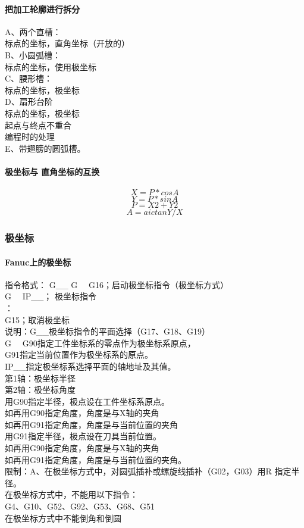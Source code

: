 \paragraph{把加工轮廓进行拆分}
\noindent A、两个直槽：\\
标点的坐标，直角坐标（开放的）\\
B、小圆弧槽：\\
标点的坐标，使用极坐标\\
C、腰形槽：\\
标点的坐标，极坐标\\
D、扇形台阶\\
标点的坐标，极坐标\\
起点与终点不重合\\
编程时的处理\\
E、带翅膀的圆弧槽。
\paragraph{极坐标与 直角坐标的互换}
$$X=P*cosA$$
$$Y=P*sinA$$
$$P=X2+Y2$$
$$A=aictanY/X$$
\subsubsection{极坐标}
\paragraph{Fanuc上的极坐标}
指令格式： G\_\_ G~~ G16；启动极坐标指令（极坐标方式）\\
G~~ IP\_\_； 极坐标指令\\
：\\
G15；取消极坐标\\
说明：G\_\_极坐标指令的平面选择（G17、G18、G19）\\
G~~ G90指定工件坐标系的零点作为极坐标系原点，\\
G91指定当前位置作为极坐标系的原点。\\
IP\_\_指定极坐标系选择平面的轴地址及其值。\\
第1轴：极坐标半径\\
第2轴：极坐标角度 \\
用G90指定半径，极点设在工件坐标系原点。\\
如再用G90指定角度，角度是与X轴的夹角\\
如再用G91指定角度，角度是与当前位置的夹角\\
用G91指定半径，极点设在刀具当前位置。\\
如再用G90指定角度，角度是与X轴的夹角\\
如再用G91指定角度，角度是与当前位置的夹角。\\
限制：A、在极坐标方式中，对圆弧插补或螺旋线插补（G02，G03）用R 指定半径。\\
在极坐标方式中，不能用以下指令：\\
G4、G10、G52、G92、G53、G68、G51\\
在极坐标方式中不能倒角和倒圆\\
